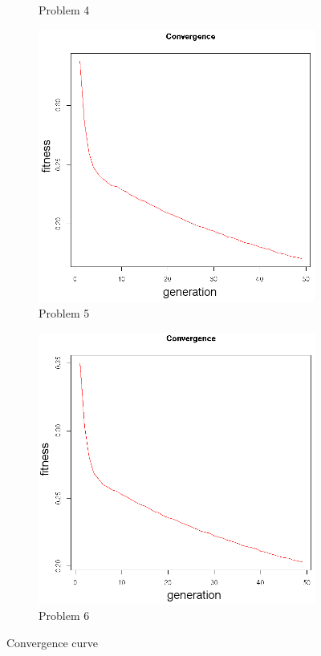 \begin{figure}[!h]
\begin{subfigure}{0.3\textwidth}
	   \caption{Problem 4}
   \end{subfigure}
      \begin{subfigure}{0.3\textwidth}
       \includegraphics[width=\textwidth]{pics/convergence5.png}
	   \caption{Problem 5}
   \end{subfigure}
      \begin{subfigure}{0.3\textwidth}
       \includegraphics[width=\textwidth]{pics/convergence6.png}
	   \caption{Problem 6}
   \end{subfigure}
   \caption{Convergence curve}
   \label{fig:convergence}
\end{figure}


